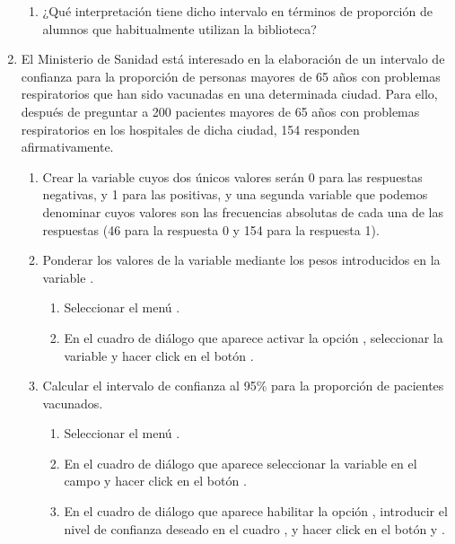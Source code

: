 \begin{enumerate}[leftmargin=*]
\begin{enumerate}
\item ¿Qué interpretación tiene dicho intervalo en términos de proporción de alumnos que habitualmente utilizan la
biblioteca?

\end{enumerate}

\item El Ministerio de Sanidad está interesado en la elaboración de un intervalo de confianza para la proporción de
personas mayores de 65 años con problemas respiratorios que han sido vacunadas en una determinada ciudad. Para ello,
después de preguntar a 200 pacientes mayores de 65 años con problemas respiratorios en los hospitales de dicha ciudad,
154 responden afirmativamente.
\begin{enumerate}
\item Crear la variable  cuyos dos únicos valores serán 0 para las respuestas negativas, y 1 para
las positivas, y una segunda variable que podemos denominar  cuyos valores son las frecuencias
absolutas de cada una de las respuestas (46 para la respuesta 0 y 154 para la respuesta 1).

\item Ponderar los valores de la variable  mediante los pesos introducidos en la variable
.
\begin{indicacion}
\begin{enumerate}
\item Seleccionar el menú .
\item En el cuadro de diálogo que aparece activar la opción , seleccionar la variable
 y hacer click en el botón .
\end{enumerate}
\end{indicacion}

\item Calcular el intervalo de confianza al 95\% para la
proporción de pacientes vacunados.
\begin{indicacion}
\begin{enumerate}
\item Seleccionar el menú .
\item En el cuadro de diálogo que aparece seleccionar la variable  en el campo
 y hacer click en el botón .
\item En el cuadro de diálogo que aparece habilitar la opción , introducir el nivel
de confianza deseado en el cuadro , y hacer click en el botón
 y .
\end{enumerate}
\end{indicacion}


\end{enumerate}
\end{enumerate}
